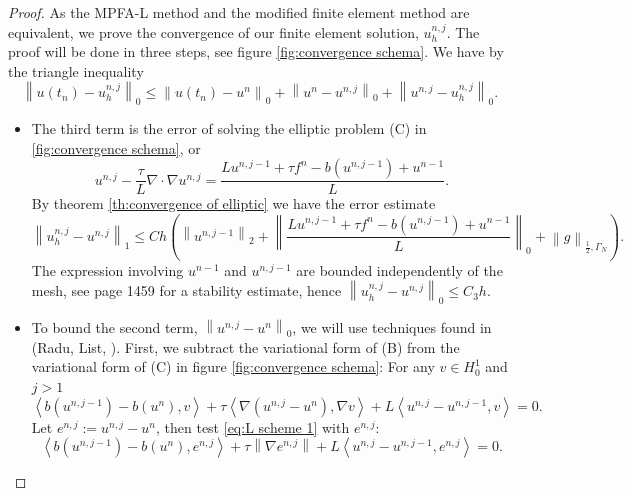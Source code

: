 \documentclass[../Main/main.tex]{subfiles}
\begin{document}
	\begin{proof}
		As the MPFA-L method and the modified finite element method are equivalent, we prove the convergence of our finite element solution, $u^{n,j}_h$.
		The proof will be done in three steps, see figure \ref{fig:convergence schema}.
		We have by the triangle inequality
		\begin{equation}
			\left \|u(t_n)-u_h^{n,j}\right \|_0 \leq\left \|u(t_n) -u^n  \right \|_0 + \left \|u^{n}-u^{n,j}\right \|_0 + \left \|u^{n,j}-u_h^{n,j}\right \|_0  .
		\end{equation}
		\begin{itemize}
			\item The third term is the error of solving the elliptic problem (C) in \ref{fig:convergence schema}, or 
			\begin{equation}\label{eq:first ineq}
				u^{n,j}-\frac{\tau}{L} \nabla \cdot \nabla u^{n,j} = \frac{L u^{n,j-1} + \tau f^n - b(u^{n,j-1}) + u^{n-1}}{L}.
			\end{equation}
			By theorem \ref{th:convergence of elliptic} we have the error estimate
			\begin{equation}
				\left \|u_h^{n,j}-u^{n,j}\right \|_1  \leq C h (\left \| u^{n,j-1} \right \|_2 + \left \| \frac{L u^{n,j-1} + \tau f^n - b(u^{n,j-1}) + u^{n-1}}{L} \right \|_0 + \left \| g \right \|_{\frac{1}{2},\Gamma_N}).
			\end{equation}
			The expression involving $u^{n-1}$ and $u^{n,j-1}$ are bounded independently of the mesh, see \cite{FlorinTimeConvergence} page 1459 for a stability estimate, hence $\left \|u_h^{n,j}-u^{n,j}\right \|_0 \leq C_3h$.
		\item To bound the second term, $\left \|u^{n,j}-u^n\right \|_0$, we will use techniques found in (Radu, List, \cite{list2016study}). First, we subtract the variational form of (B) from the variational form of (C) in figure \ref{fig:convergence schema}:
		For any $v\in H_0^1$ and $j>1$
		\begin{equation}\label{eq:L scheme 1}
			\left\langle b(u^{n,j-1})-b(u^n),v\right \rangle + \tau \left \langle \nabla (u^{n,j}-u^n), \nabla v\right \rangle +L\left \langle u^{n,j}-u^{n,j-1} ,v\right \rangle=0.
		\end{equation}
		Let $e^{n,j}:=u^{n,j}-u^n$, then test \eqref{eq:L scheme 1} with $e^{n,j}$:
		\begin{equation}
\left\langle b(u^{n,j-1})-b(u^n),e^{n,j}\right \rangle + \tau \left \| \nabla e^{n,j}\right \| +L\left \langle u^{n,j}-u^{n,j-1} ,e^{n,j}\right \rangle=0.

\end{equation}
\end{itemize}
\end{proof}
\end{document}
